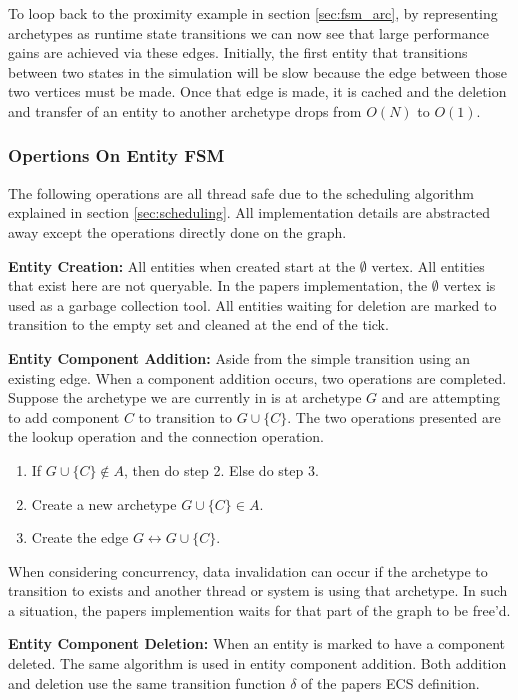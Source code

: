 To loop back to the proximity example in section \ref{sec:fsm_arc}, by representing archetypes as runtime state transitions we can now see that large performance gains are achieved via these edges. Initially, the first entity that transitions between two states in the simulation will be slow because the edge between those two vertices must be made. Once that edge is made, it is cached and the deletion and transfer of an entity to another archetype drops from $O(N)$ to $O(1)$.

\subsubsection{Opertions On Entity FSM}
The following operations are all thread safe due to the scheduling algorithm explained in section \ref{sec:scheduling}. All implementation details are abstracted away except the operations directly done on the graph. 

\textbf{Entity Creation:} All entities when created start at the $\emptyset$ vertex. All entities that exist here are not queryable. In the papers implementation, the $\emptyset$ vertex is used as a garbage collection tool. All entities waiting for deletion are marked to transition to the empty set and cleaned at the end of the tick. 

\textbf{Entity Component Addition: } Aside from the simple transition using an existing edge. When a component addition occurs, two operations are completed. Suppose the archetype we are currently in is at archetype $G$ and are attempting to add component $C$ to transition to $G \cup \{C\}$. The two operations presented are the lookup operation and the connection operation.

\begin{enumerate}
    \item If $G \cup \{C\} \not\in A$, then do step 2. Else do step 3.
    \item Create a new archetype $G \cup \{C\} \in A$.
    \item Create the edge $G \leftrightarrow G \cup \{C\}$.
\end{enumerate}

When considering concurrency, data invalidation can occur if the archetype to transition to exists and another thread or system is using that archetype. In such a situation, the papers implemention waits for that part of the graph to be free'd.

\textbf{Entity Component Deletion: } When an entity is marked to have a component deleted. The same algorithm is used in entity component addition. Both addition and deletion use the same transition function $\delta$ of the papers ECS definition.  

